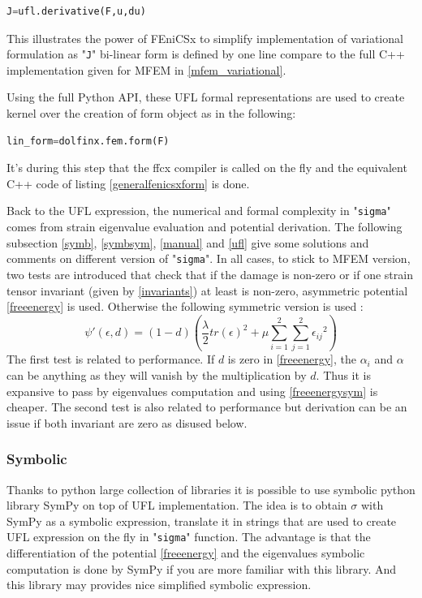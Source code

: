 \documentclass[12pt]{article}
\newcommand{\f}[1]{FEniCSx#1}
\newcommand{\tens}[1]{
	{\ensuremath{\mathsf{#1}}}
}
\newcommand{\mycodepy}[1]{\textsf{"}\lstinline[language=Python]`#1`\textsf{"}}
\begin{document}
\begin{lstlisting}[numbers=none,basicstyle=\footnotesize,language=python,label=Jfenicsxpy]
J=ufl.derivative(F,u,du)
\end{lstlisting}
This illustrates the power of \f{} to simplify implementation of variational formulation as \mycodepy{J} bi-linear form is defined by one line compare to the full C++ implementation given for  MFEM in \ref{mfem_variational}.

Using the full Python API, these UFL formal representations are used to create kernel over the creation of form object as in the following:
\begin{lstlisting}[numbers=none,basicstyle=\footnotesize,language=python,label=Formfenicsxpy]
	lin_form=dolfinx.fem.form(F)
\end{lstlisting}
It's during this step that the ffcx compiler is called on the fly and the equivalent C++ code of listing \ref{generalfenicsxform} is done.

Back to the UFL expression, the numerical and formal complexity in \mycodepy{sigma} comes from strain eigenvalue evaluation and potential derivation.
The following subsection \ref{symb}, \ref{symbsym},  \ref{manual} and \ref{ufl} give some solutions and comments on different version of  \mycodepy{sigma}. In all cases, to stick to MFEM version, two tests are introduced  that check that if the damage is non-zero or if one strain tensor invariant (given by \eqref{invariants}) at least is non-zero, asymmetric potential \eqref{freeenergy} is used. Otherwise the following symmetric version is used : 
\begin{equation}
	\psi'(\tens{\epsilon},d)=(1- d)\left(\frac{\lambda}{2}tr(\tens{\epsilon})^2 + \mu \sum_{i=1}^{2}\sum_{j=1}^{2}{\epsilon_{ij}}^2 \right)
	\label{freeenergysym}
\end{equation}
The first test is related to performance.
If $d$ is zero in \eqref{freeenergy}, the $\alpha_i$ and $\alpha$ can be anything as they will vanish by the multiplication by $d$. Thus it is expansive to pass by eigenvalues computation and using \eqref{freeenergysym} is cheaper.
The second test is also related to performance but  derivation can be an issue if both invariant are zero as disused below.



\subsubsection{Symbolic\label{symb}}
Thanks to python large collection of libraries it is possible to use symbolic python library SymPy on top of UFL implementation. The idea is to obtain $\tens{\sigma}$ with SymPy as a symbolic expression, translate it in strings that are used  to create UFL expression on the fly in \mycodepy{sigma} function. The advantage is that the differentiation of the potential \eqref{freeenergy} and the eigenvalues symbolic computation is  done  by SymPy if you are more familiar with this library. And  this library may provides nice simplified symbolic expression. 
\end{document}
